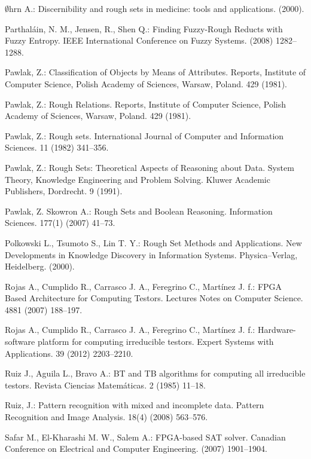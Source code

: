 \documentclass[11pt]{article}   %
\begin{document}
\begin{thebibliography}{}
	$\emptyset$hrn A.:
	Discernibility and rough sets in medicine: tools and applications. (2000).	
	 
	Parthaláin, N. M., Jensen, R., Shen Q.:
	Finding Fuzzy-Rough Reducts with Fuzzy Entropy.
	IEEE International Conference on Fuzzy Systems. (2008) 1282--1288.
	
	Pawlak, Z.: 
	Classification of Objects by Means of Attributes.
	Reports, Institute of Computer Science, Polish Academy of Sciences, Warsaw, Poland. 429 (1981).

	Pawlak, Z.:
	Rough Relations.
	Reports, Institute of Computer Science, Polish Academy of Sciences, Warsaw, Poland. 429 (1981).

	Pawlak, Z.: 
	Rough sets.
	International Journal of Computer and Information Sciences. 11 (1982) 341--356.

	Pawlak, Z.: 
	Rough Sets: Theoretical Aspects of Reasoning about Data.
	System Theory, Knowledge Engineering and Problem Solving. 
	Kluwer Academic Publishers, Dordrecht. 9 (1991).
	
	Pawlak, Z. Skowron A.: 
	Rough Sets and Boolean Reasoning.
	Information Sciences. 177(1) (2007) 41--73.
	
	Polkowski L., Tsumoto S., Lin T. Y.: 
	Rough Set Methods and Applications. 
	New Developments in Knowledge Discovery in Information Systems.
	Physica–Verlag, Heidelberg. (2000).

	Rojas A., Cumplido R., Carrasco J. A., Feregrino C., Mart\'inez J. f.:
	FPGA Based Architecture for Computing Testors. 
	Lectures Notes on Computer Science. 4881 (2007) 188--197.

	Rojas A., Cumplido R., Carrasco J. A., Feregrino C., Mart\'inez J. f.:
	Hardware-software platform for computing irreducible testors. 
	Expert Systems with Applications. 39 (2012) 2203--2210.

	Ruiz J., Aguila L., Bravo A.:
	BT and TB algorithms for computing all irreducible testors. 
	Revista Ciencias Matem\'aticas. 2 (1985) 11--18.
	
	Ruiz, J.:
 	Pattern recognition with mixed and incomplete data. 
 	Pattern Recognition and Image Analysis. 18(4) (2008) 563--576.
 	
	Safar M., El-Kharashi M. W., Salem A.:
	FPGA-based SAT solver. 
	Canadian Conference on Electrical and Computer Engineering. (2007) 1901--1904. 
	

\end{thebibliography}
\end{document}
